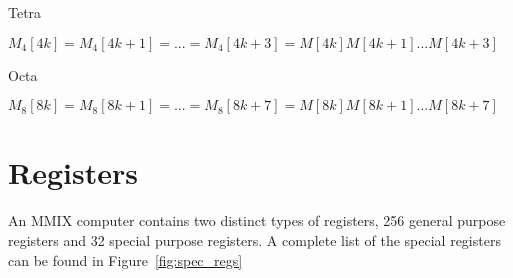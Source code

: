 \documentclass[a4paper,11pt]{report}
\begin{document}
Tetra

\begin{math}
M_4[4k] = M_4[4k+1] = ... = M_4[4k+3] = M[4k]M[4k+1]...M[4k+3]
\end{math}

Octa

\begin{math}
M_8[8k] = M_8[8k+1] = ... = M_8[8k+7] = M[8k]M[8k+1]...M[8k+7]
\end{math}

\section{Registers}
An MMIX computer contains two distinct types of registers, 256 general purpose registers and 32 special purpose registers. A complete list of the special registers can be found in Figure~\ref{fig:spec_regs}
\end{document}
